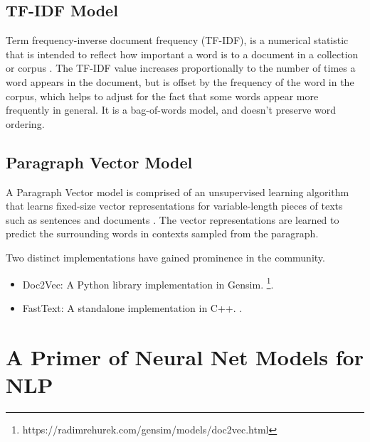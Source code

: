 \documentclass[11pt,a4paper]{article}
\begin{document}

  \subsection{TF-IDF Model} %
  \label{sub:tf_idf_model}
    Term frequency-inverse document frequency (TF-IDF), is a numerical statistic that is intended to reflect how important a word is to a document in a collection or corpus \cite{sparck1972statistical}. The TF-IDF value increases proportionally to the number of times a word appears in the document, but is offset by the frequency of the word in the corpus, which helps to adjust for the fact that some words appear more frequently in general. It is a bag-of-words model, and doesn't preserve word ordering.


  \subsection{Paragraph Vector Model} %
  \label{sub:paragraph_vectors_doc2vec}

    A Paragraph Vector model is comprised of an unsupervised learning algorithm that learns fixed-size vector representations for variable-length pieces of texts such as sentences and documents \cite{le2014distributed}. The vector representations are learned to predict the surrounding words in contexts sampled from the paragraph. 

    Two distinct implementations have gained prominence in the community.
    \begin{itemize}
      \item
        Doc2Vec: A Python library implementation in Gensim. \footnote{https://radimrehurek.com/gensim/models/doc2vec.html}.
      \item
        FastText: A standalone implementation in C++. \cite{bojanowski2016enriching} \cite{joulin2016bag}.
    \end{itemize}




\section{A Primer of Neural Net Models for NLP\cite{goldberg2016primer}} %
\label{sec:a_primer_of_neural_net_models_for_nlp}
\end{document}
